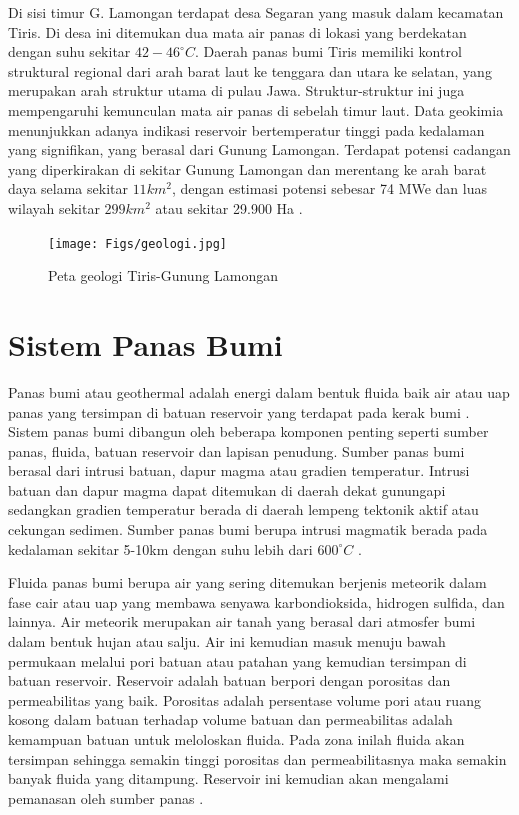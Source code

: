 \hspace{25pt} Di sisi timur G. Lamongan terdapat desa Segaran yang masuk dalam kecamatan Tiris. Di desa ini ditemukan dua mata air panas di lokasi yang berdekatan dengan suhu sekitar $42-46^{\circ}C$. Daerah panas bumi Tiris memiliki kontrol struktural regional dari arah barat laut ke tenggara dan utara ke selatan, yang merupakan arah struktur utama di pulau Jawa. Struktur-struktur ini juga mempengaruhi kemunculan mata air panas di sebelah timur laut. Data geokimia menunjukkan adanya indikasi reservoir bertemperatur tinggi pada kedalaman yang signifikan, yang berasal dari Gunung Lamongan. Terdapat potensi cadangan yang diperkirakan di sekitar Gunung Lamongan dan merentang ke arah barat daya selama sekitar $11 km^2$, dengan estimasi potensi sebesar 74 MWe dan luas wilayah sekitar $299 km^2$ atau sekitar 29.900 Ha \cite{GLamongan}.

\begin{figure}[h]
	\centering
	\texttt{[image: Figs/geologi.jpg]}
	\caption{Peta geologi Tiris-Gunung Lamongan}
	\label{fig:geologi}
\end{figure}

\section{Sistem Panas Bumi}
\hspace{25pt}Panas bumi atau geothermal adalah energi dalam bentuk fluida baik air atau uap panas yang tersimpan di batuan reservoir yang terdapat pada kerak bumi \citep{GuptaRoy2007}. Sistem panas bumi dibangun oleh beberapa komponen penting seperti sumber panas, fluida, batuan reservoir dan lapisan penudung. Sumber panas bumi berasal dari intrusi batuan, dapur magma atau gradien temperatur. Intrusi batuan dan dapur magma dapat ditemukan di daerah dekat gunungapi sedangkan gradien temperatur berada di daerah lempeng tektonik aktif atau cekungan sedimen. Sumber panas bumi berupa intrusi magmatik berada pada kedalaman sekitar 5-10km dengan suhu lebih dari $600^{\circ}C$ \citep{DicksonFanelli1995}. 

\hspace{25pt}Fluida panas bumi berupa air yang sering ditemukan berjenis meteorik dalam fase cair atau uap yang membawa senyawa karbondioksida, hidrogen sulfida, dan lainnya. Air meteorik merupakan air tanah yang berasal dari atmosfer bumi dalam bentuk hujan atau salju. Air ini kemudian masuk menuju bawah permukaan melalui pori batuan atau patahan yang kemudian tersimpan di batuan reservoir. Reservoir adalah batuan berpori dengan porositas dan permeabilitas yang baik. Porositas adalah persentase volume pori atau ruang kosong dalam batuan terhadap volume batuan dan permeabilitas adalah kemampuan batuan untuk meloloskan fluida. Pada zona inilah fluida akan tersimpan sehingga semakin tinggi porositas dan permeabilitasnya maka semakin banyak fluida yang ditampung. Reservoir ini kemudian akan mengalami pemanasan oleh sumber panas \citep{DicksonFanelli1995}.


